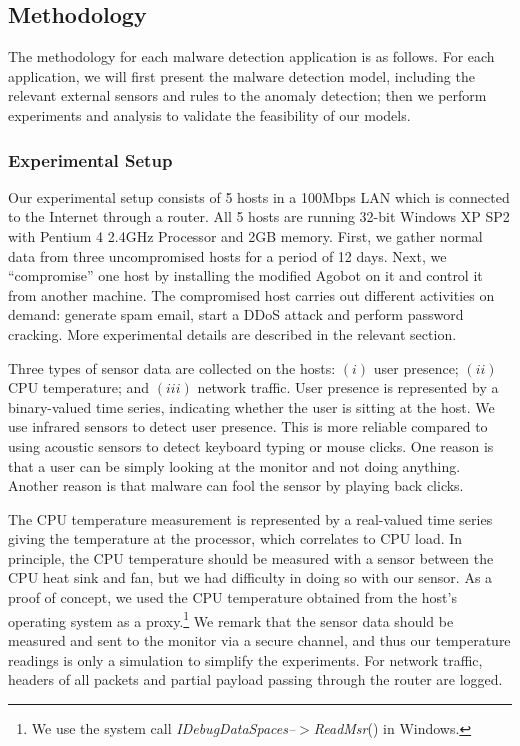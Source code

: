 \subsection{Methodology}

The methodology for each malware detection application is as follows.  For each
application, we will first present the malware detection model, including the
relevant external sensors and rules to the anomaly detection; then we perform
experiments and analysis to validate the feasibility of our models.

\subsubsection{Experimental Setup}
Our experimental setup consists of 5 hosts in a 100Mbps LAN which is connected
to the Internet through a router.
All 5 hosts are running 32-bit Windows XP SP2 with Pentium 4 2.4GHz Processor and
2GB memory.
First, we gather normal data from three
uncompromised hosts for a period of 12 days. Next, we ``compromise''
one host by installing the modified Agobot on it and control it from
another machine. The compromised host carries out
different activities on demand: generate spam email, start a DDoS
attack and perform password cracking.
More experimental details are described in the relevant section.

Three types of sensor data are collected on the hosts: $(i)$
user presence; $(ii)$ CPU temperature; and $(iii)$ network traffic.
User presence is represented by a binary-valued time series,
indicating whether the user is sitting at the host.
We use infrared sensors to detect user presence.
This is more reliable compared
to using acoustic sensors to detect keyboard typing or mouse clicks.
One reason is that a user can be simply looking at the monitor and not
doing anything.
Another reason is that malware can fool the sensor by playing back clicks.

The CPU temperature measurement
is represented by a real-valued time series giving the
temperature at the processor, which correlates to CPU load. In
principle, the CPU temperature should be measured with a sensor
between the CPU heat sink and fan, but we had difficulty in doing so
with our sensor. As a proof of concept, we used the CPU
temperature obtained from the host's operating system as a
proxy.\footnote{We use the
system call \emph{IDebugDataSpaces--$>$ReadMsr}() in Windows.
}
We remark that the sensor data should be measured and sent to the
monitor via a secure channel, and thus our temperature readings
is only a simulation to simplify the experiments.
For network traffic, headers of all packets and partial payload
passing through the router are logged.

